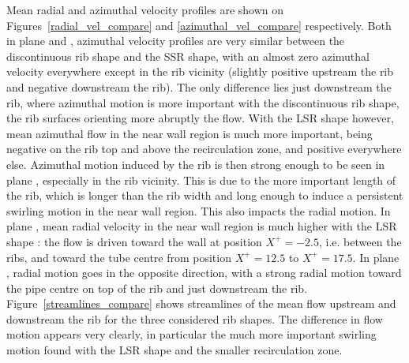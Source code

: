Mean radial and azimuthal velocity profiles are shown on Figures~\ref{radial_vel_compare} and \ref{azimuthal_vel_compare} respectively. Both in plane  and , azimuthal velocity profiles are very similar between the discontinuous rib shape and the SSR shape, with an almost zero azimuthal velocity everywhere except in the rib vicinity (slightly positive upstream the rib and negative downstream the rib). The only difference lies just downstream the rib, where azimuthal motion is more important with the discontinuous rib shape, the rib surfaces orienting more abruptly the flow. With the LSR shape however, mean azimuthal flow in the near wall region is much more important, being negative on the rib top and above the recirculation zone, and positive everywhere else. Azimuthal motion induced by the rib is then strong enough to be seen in plane , especially in the rib vicinity. This is due to the more important length of the rib, which is longer than the rib width and long enough to induce a persistent swirling motion in the near wall region. This also impacts the radial motion. In plane , mean radial velocity in the near wall region is much higher with the LSR shape : the flow is driven toward the wall at position $X^+=-2.5$, i.e. between the ribs, and toward the tube centre from position $X^+=12.5$ to $X^+=17.5$. In plane , radial motion goes in the opposite direction, with a strong radial motion toward the pipe centre on top of the rib and just downstream the rib. Figure~\ref{streamlines_compare} shows streamlines of the mean flow upstream and downstream the rib for the three considered rib shapes. The difference in flow motion appears very clearly, in particular the much more important swirling motion found with the LSR shape and the smaller recirculation zone.

